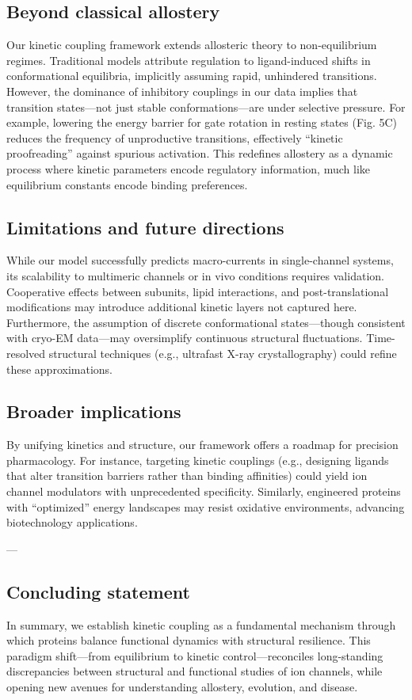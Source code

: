 \documentclass[a4paper,12pt]{article}
\begin{document}
	
	
	\subsection{Beyond classical allostery}
	Our kinetic coupling framework extends allosteric theory to non-equilibrium regimes. Traditional models attribute regulation to ligand-induced shifts in conformational equilibria, implicitly assuming rapid, unhindered transitions. However, the dominance of inhibitory couplings in our data implies that transition states—not just stable conformations—are under selective pressure. For example, lowering the energy barrier for gate rotation in resting states (Fig. 5C) reduces the frequency of unproductive transitions, effectively “kinetic proofreading” against spurious activation. This redefines allostery as a dynamic process where kinetic parameters encode regulatory information, much like equilibrium constants encode binding preferences.  
	
	\subsection{Limitations and future directions}
	While our model successfully predicts macro-currents in single-channel systems, its scalability to multimeric channels or in vivo conditions requires validation. Cooperative effects between subunits, lipid interactions, and post-translational modifications may introduce additional kinetic layers not captured here. Furthermore, the assumption of discrete conformational states—though consistent with cryo-EM data—may oversimplify continuous structural fluctuations. Time-resolved structural techniques (e.g., ultrafast X-ray crystallography) could refine these approximations.  
	
	\subsection{Broader implications} 
	By unifying kinetics and structure, our framework offers a roadmap for precision pharmacology. For instance, targeting kinetic couplings (e.g., designing ligands that alter transition barriers rather than binding affinities) could yield ion channel modulators with unprecedented specificity. Similarly, engineered proteins with “optimized” energy landscapes may resist oxidative environments, advancing biotechnology applications.  
	
	---
	
	\subsection{Concluding statement}  
	In summary, we establish kinetic coupling as a fundamental mechanism through which proteins balance functional dynamics with structural resilience. This paradigm shift—from equilibrium to kinetic control—reconciles long-standing discrepancies between structural and functional studies of ion channels, while opening new avenues for understanding allostery, evolution, and disease.  
	
\end{document}
